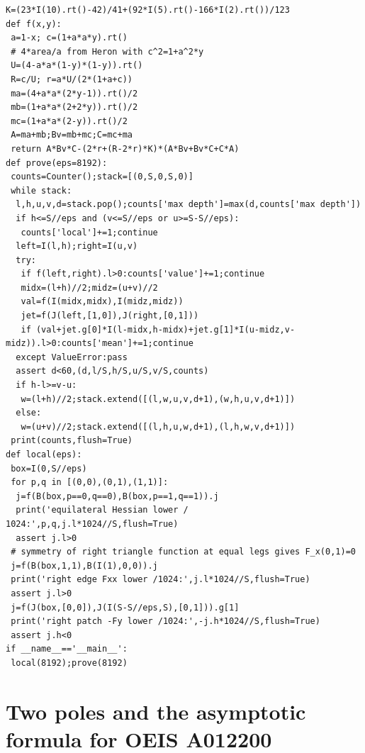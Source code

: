 \documentclass[11pt,a4paper]{article}
\numberwithin{equation}{section}
\theoremstyle{definition}
\theoremstyle{remark}
\begin{document}
\begin{Verbatim}
K=(23*I(10).rt()-42)/41+(92*I(5).rt()-166*I(2).rt())/123
def f(x,y):
 a=1-x; c=(1+a*a*y).rt()
 # 4*area/a from Heron with c^2=1+a^2*y
 U=(4-a*a*(1-y)*(1-y)).rt()
 R=c/U; r=a*U/(2*(1+a+c))
 ma=(4+a*a*(2*y-1)).rt()/2
 mb=(1+a*a*(2+2*y)).rt()/2
 mc=(1+a*a*(2-y)).rt()/2
 A=ma+mb;Bv=mb+mc;C=mc+ma
 return A*Bv*C-(2*r+(R-2*r)*K)*(A*Bv+Bv*C+C*A)
def prove(eps=8192):
 counts=Counter();stack=[(0,S,0,S,0)]
 while stack:
  l,h,u,v,d=stack.pop();counts['max depth']=max(d,counts['max depth'])
  if h<=S//eps and (v<=S//eps or u>=S-S//eps):
   counts['local']+=1;continue
  left=I(l,h);right=I(u,v)
  try:
   if f(left,right).l>0:counts['value']+=1;continue
   midx=(l+h)//2;midz=(u+v)//2
   val=f(I(midx,midx),I(midz,midz))
   jet=f(J(left,[1,0]),J(right,[0,1]))
   if (val+jet.g[0]*I(l-midx,h-midx)+jet.g[1]*I(u-midz,v-midz)).l>0:counts['mean']+=1;continue
  except ValueError:pass
  assert d<60,(d,l/S,h/S,u/S,v/S,counts)
  if h-l>=v-u:
   w=(l+h)//2;stack.extend([(l,w,u,v,d+1),(w,h,u,v,d+1)])
  else:
   w=(u+v)//2;stack.extend([(l,h,u,w,d+1),(l,h,w,v,d+1)])
 print(counts,flush=True)
def local(eps):
 box=I(0,S//eps)
 for p,q in [(0,0),(0,1),(1,1)]:
  j=f(B(box,p==0,q==0),B(box,p==1,q==1)).j
  print('equilateral Hessian lower / 1024:',p,q,j.l*1024//S,flush=True)
  assert j.l>0
 # symmetry of right triangle function at equal legs gives F_x(0,1)=0
 j=f(B(box,1,1),B(I(1),0,0)).j
 print('right edge Fxx lower /1024:',j.l*1024//S,flush=True)
 assert j.l>0
 j=f(J(box,[0,0]),J(I(S-S//eps,S),[0,1])).g[1]
 print('right patch -Fy lower /1024:',-j.h*1024//S,flush=True)
 assert j.h<0
if __name__=='__main__':
 local(8192);prove(8192)
\end{Verbatim}
\endgroup

\par\endgroup

\begingroup
\newcommand{\at}{\operatorname{arctan}}
\newcommand{\ath}{\operatorname{arctanh}}
\section{\texorpdfstring{Two poles and the asymptotic formula for OEIS A012200}{Two poles and the asymptotic formula for OEIS A012200}}\label{section:r37taisho}
\par\medskip
\end{document}
